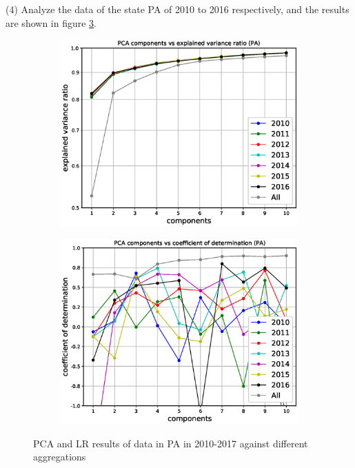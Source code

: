 \documentclass{mcmthesis}
\begin{document}
(4) Analyze the data of the state PA of 2010 to 2016 respectively, and the results are shown in figure \ref{fig:pca_year_PA}.
    \begin{figure}[H]
    \centering
    \begin{subfigure}[b]{0.49\textwidth}
        \includegraphics[width=\textwidth]{../figure/pca_year_PA_ratio.eps}
        \label{fig:pca_year_PA_ratio}
    \end{subfigure}
    \begin{subfigure}[b]{0.49\textwidth}
        \includegraphics[width=\textwidth]{../figure/pca_year_PA_score.eps}
        \label{fig:pca_year_PA_score}
    \end{subfigure}
    \caption{PCA and LR results of data in PA in 2010-2017 against different aggregations}\label{fig:pca_year_PA}
\end{figure}
\end{document}
